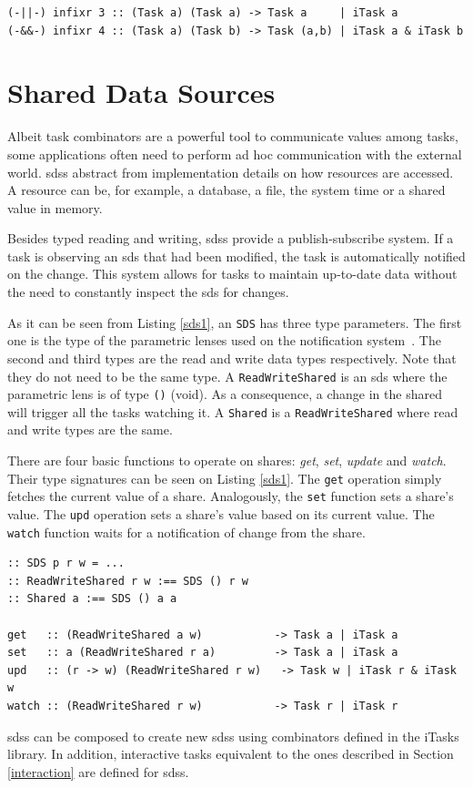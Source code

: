 \begin{lstlisting}[caption=Parallel combinators,label=par_comb,captionpos=b]
(-||-) infixr 3 :: (Task a) (Task a) -> Task a     | iTask a
(-&&-) infixr 4 :: (Task a) (Task b) -> Task (a,b) | iTask a & iTask b
\end{lstlisting}


\section{Shared Data Sources}

Albeit task combinators are a powerful tool to 
communicate values among tasks, some applications often need to perform ad hoc communication with the external world. \acp{sds} abstract from implementation details on how resources are accessed. A resource can be, for example, a database, a file, the system time or a shared value in memory. 

Besides typed reading and writing, \acp{sds} provide a publish-subscribe system. If a task is observing an \ac{sds} that had been modified, the task is automatically notified on the change. This system allows for tasks to maintain up-to-date data without the need to constantly inspect the \ac{sds} for changes.

As it can be seen from Listing \ref{sds1}, an \texttt{SDS} has three type parameters. The first one is the type of the parametric lenses used on the notification system~\cite{parametric}. The second and third types are the read and write data types respectively. Note that they do not need to be the same type. A \texttt{ReadWriteShared} is an \ac{sds} where the parametric lens is of type \texttt{()} (void). As a consequence, a change in the shared will trigger all the tasks watching it. A \texttt{Shared} is a \texttt{ReadWriteShared} where read and write types are the same.

There are four basic functions to operate on shares: \textit{get}, \textit{set}, \textit{update} and \textit{watch}. Their type signatures can be seen on Listing \ref{sds1}. The \texttt{get} operation simply fetches the current value of a share. Analogously, the \texttt{set} function sets a share's value. The \texttt{upd} operation sets a share's value based on its current value. The \texttt{watch} function waits for a notification of change from the share.

\begin{lstlisting}[caption=Shared Data Sources definitions,label=sds1,captionpos=b]
:: SDS p r w = ...
:: ReadWriteShared r w :== SDS () r w
:: Shared a :== SDS () a a

get   :: (ReadWriteShared a w)           -> Task a | iTask a
set   :: a (ReadWriteShared r a)         -> Task a | iTask a
upd   :: (r -> w) (ReadWriteShared r w)   -> Task w | iTask r & iTask w
watch :: (ReadWriteShared r w)           -> Task r | iTask r
\end{lstlisting}

\acp{sds} can be composed to create new \acp{sds} using combinators defined in the iTasks library. In addition, interactive tasks equivalent to the ones described in Section \ref{interaction} are defined for \acp{sds}. 